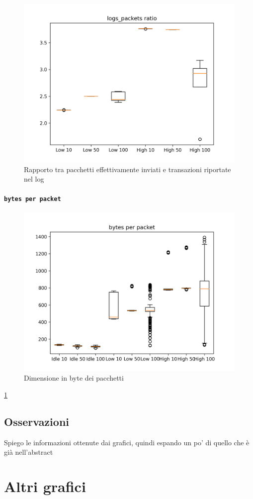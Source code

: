 \documentclass[12pt, a4paper]{article}
\begin{document}
\begin{figure}[H]
    \includegraphics[width=\linewidth]{graphs/logs_packets ratio.png}
    \caption{Rapporto tra pacchetti effettivamente inviati e transazioni riportate nel log}
    \label{fig:lpr}
\end{figure}

\paragraph{\lstinline{bytes per packet}}

\begin{figure}[H]
    \includegraphics[width=\linewidth]{graphs/bytes per packet.png}
    \caption{Dimensione in byte dei pacchetti}
    \label{fig:bp}
\end{figure}

\ref{appendix:grafici}

\subsection{Osservazioni}

Spiego le informazioni ottenute dai grafici, quindi espando un po' di quello che è già nell'abstract \\




\newpage
\appendix

\section{Altri grafici}\label{appendix:grafici}
\end{document}
